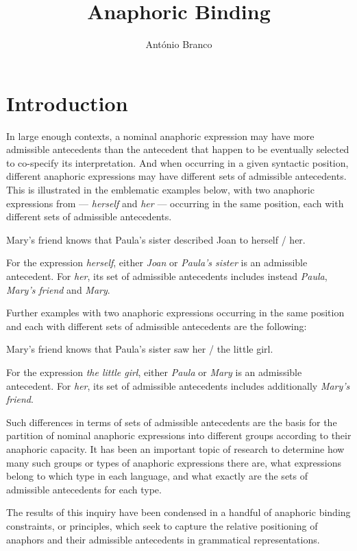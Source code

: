 \documentclass[output=paper
,modfonts
,nonflat]{langsci/langscibook}
\title{Anaphoric Binding}
\author{%
António Branco\affiliation{University of Lisbon}
}
\begin{document}
\label{chap-binding}

\section{Introduction} 


In large enough contexts, a nominal anaphoric expression may have more
admissible antecedents than the antecedent that happen
to be eventually selected to co-specify its interpretation. 
And when occurring in a given syntactic position, different anaphoric expressions may 
have different sets of admissible antecedents. This is illustrated in the emblematic examples 
below, with two anaphoric expressions from  --- \textit{herself} and \textit{her} --- 
occurring in the same position, each with different sets of admissible antecedents.

\begin{exe}
\ex Mary's friend knows that Paula's sister described Joan to herself / her.
\end{exe}

For the expression \textit{herself}, either \textit{Joan} or \textit{Paula's sister} is an admissible antecedent. 
For \textit{her}, its set of admissible antecedents includes instead \textit{Paula}, \textit{Mary's friend} and \textit{Mary}.

Further examples with two anaphoric expressions occurring in the same position
and each with different sets of admissible antecedents are the following:

\begin{exe}
\ex Mary's friend knows that Paula's sister saw her / the little girl.
\end{exe}

For the expression \textit{the little girl}, either \textit{Paula} or \textit{Mary} is an admissible antecedent. 
For \textit{her}, its set of admissible antecedents includes additionally \textit{Mary's friend}.

Such differences in terms of sets of admissible antecedents are the basis for 
the partition of nominal anaphoric expressions into different groups according to their anaphoric
capacity. It has been an important topic of research to determine
how many such  groups or types of anaphoric expressions there are, what expressions belong
to which type in each language, and what exactly are the sets of admissible antecedents for each type.

The results of this inquiry have been condensed in a handful of anaphoric 
binding constraints, or principles, which seek to capture the relative positioning of anaphors and their 
admissible antecedents in grammatical representations. 
\end{document}
